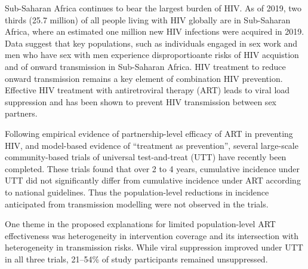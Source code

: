 Sub-Saharan Africa continues to bear the largest burden of HIV.		%
As of 2019, two thirds (25.7 million) of all people living with HIV globally are in Sub-Saharan Africa, where 
an estimated one million new HIV infections were acquired in 2019.\cite{AIDSinfo}
Data suggest that key populations, such as individuals engaged in sex work and men who have sex with men experience 
disproportioante risks of HIV acquistion and of onward transmission in Sub-Saharan Africa. 
HIV treatment to reduce onward transmission remains a key element of 
combination HIV prevention.\cite{WHO2016ART}
Effective HIV treatment with antiretroviral therapy (ART) leads to
viral load suppression and has been shown to prevent HIV 
transmission between sex partners.\cite{Lundgren2015,Danel2015,Cohen2016} %
\par
Following empirical evidence of partnership-level efficacy of ART
in preventing HIV, \cite{Lundgren2015,Danel2015,Cohen2016}
and model-based evidence of ``treatment as prevention'',\cite{Granich2009,Eaton2012} %
several large-scale community-based trials of universal test-and-treat (UTT)
have recently been completed.\cite{Iwuji2018,Havlir2019,Hayes2019} %
These trials found that over 2 to 4 years,
cumulative incidence under UTT did not significantly differ from
cumulative incidence under ART according to national guidelines.\cite{Havlir2019,Hayes2019,Iwuji2018}
Thus the population-level reductions in incidence anticipated from transmission modelling were not observed in the trials. %
\par
One theme in the proposed explanations for limited population-level ART effectiveness
was heterogeneity in intervention coverage and its intersection with heterogeneity in transmission risks.\cite{AbdoolKarim2019,Baral2019}
While viral suppression improved under UTT in all three trials,
21--54\% of study participants remained unsuppressed.\cite{Iwuji2018,Havlir2019,Hayes2019}
